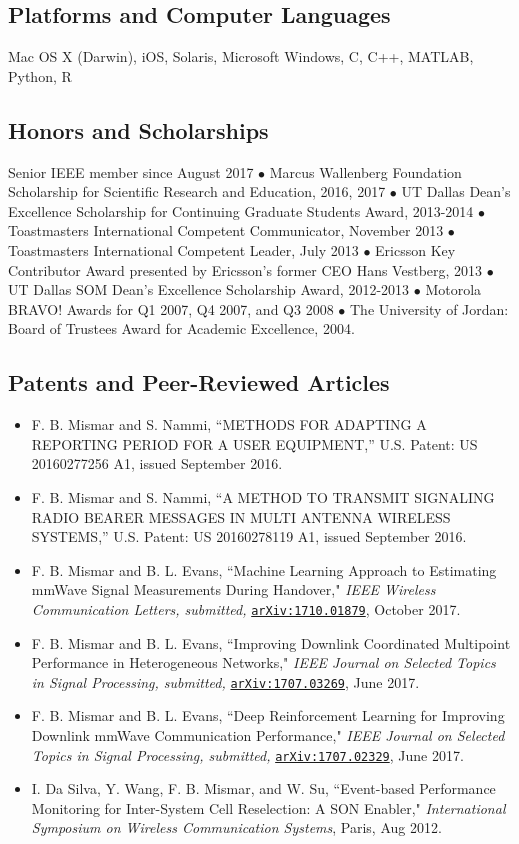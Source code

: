 \documentclass{article}
\begin{document}
\subsection*{\sc Platforms and Computer Languages}
Mac OS X (Darwin), iOS, Solaris, Microsoft Windows, C, C++, MATLAB, Python, R
\vspace*{-0.1in}
\subsection*{\sc Honors and Scholarships}
Senior IEEE member since August 2017 $\bullet$ Marcus Wallenberg Foundation Scholarship for Scientific Research and Education, 2016, 2017 $\bullet$ UT Dallas Dean's Excellence Scholarship for Continuing Graduate Students Award, 2013-2014 $\bullet$ Toastmasters International Competent Communicator, November 2013 $\bullet$ Toastmasters International Competent Leader, July 2013 $\bullet$ Ericsson Key Contributor Award presented by Ericsson's former CEO Hans Vestberg, 2013 $\bullet$ UT Dallas SOM Dean's Excellence Scholarship Award, 2012-2013 $\bullet$ Motorola BRAVO! Awards for Q1 2007, Q4 2007, and Q3 2008 $\bullet$ The University of Jordan: Board of Trustees Award for Academic Excellence, 2004.
\subsection*{\sc Patents and Peer-Reviewed Articles}
\begin{itemize}[leftmargin=*]
\item F. B. Mismar and S. Nammi, ``METHODS FOR ADAPTING A REPORTING PERIOD FOR A USER EQUIPMENT,'' U.S. Patent: US 20160277256 A1, issued September 2016.
\item F. B. Mismar and S. Nammi, ``A METHOD TO TRANSMIT SIGNALING RADIO BEARER MESSAGES IN MULTI ANTENNA WIRELESS  SYSTEMS,'' U.S. Patent: US 20160278119 A1, issued September 2016.
\item F. B. Mismar and B. L. Evans, ``Machine Learning Approach to Estimating mmWave Signal Measurements During Handover," \textit{IEEE Wireless Communication Letters, submitted,} \href{https://arxiv.org/pdf/1707.01879.pdf}{\nolinkurl{arXiv:1710.01879}}, October 2017.
\item F. B. Mismar and B. L. Evans, ``Improving Downlink Coordinated Multipoint Performance in Heterogeneous Networks," \textit{IEEE Journal on Selected Topics in Signal Processing, submitted,} \href{https://arxiv.org/pdf/1707.03269.pdf}{\nolinkurl{arXiv:1707.03269}}, June 2017.
\item F. B. Mismar and B. L. Evans, ``Deep Reinforcement Learning for Improving Downlink mmWave Communication Performance," \textit{IEEE Journal on Selected Topics in Signal Processing, submitted,} 
\href{https://arxiv.org/pdf/1707.02329.pdf}{\nolinkurl{arXiv:1707.02329}}, June 2017.
\item I. Da Silva, Y. Wang, F. B. Mismar, and W. Su, ``Event-based Performance Monitoring for Inter-System Cell Reselection: A SON Enabler," \textit{International Symposium on Wireless Communication Systems}, Paris, Aug 2012.
\end{itemize}
\vspace*{-0.1in}
\end{document}

